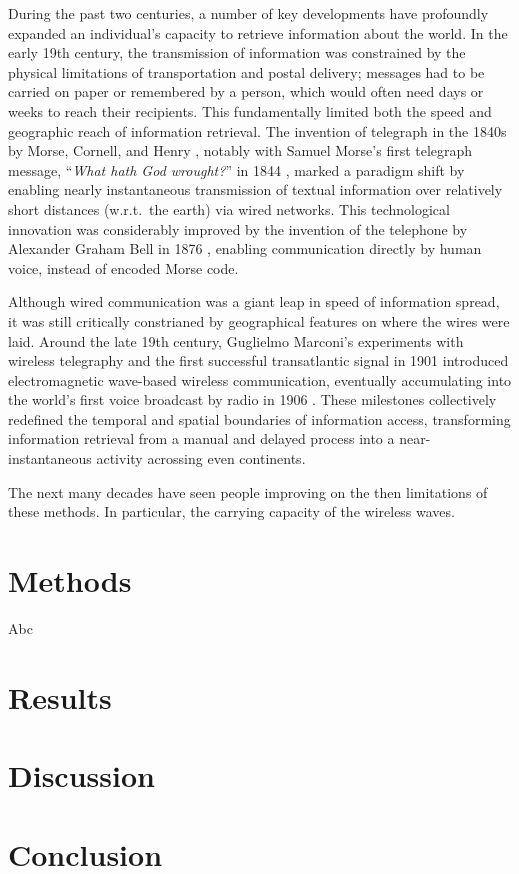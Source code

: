 \documentclass[project-plan]{report-template}
\begin{document}
During the past two centuries, a number of key developments have profoundly
expanded an individual's capacity to retrieve information about the world. In
the early 19th century, the transmission of information was constrained by the
physical limitations of transportation and postal delivery; messages had to be
carried on paper or remembered by a person, which would often need days or
weeks to reach their recipients. This fundamentally limited both the speed and
geographic reach of information retrieval. The invention of telegraph in the
1840s by Morse, Cornell, and Henry \cite{history.telegraph.1,
history.telegraph.2}, notably with Samuel Morse's first telegraph message,
``\emph{What hath God wrought?}'' in 1844 \cite{first.telegraph.msg}, marked a
paradigm shift by enabling nearly instantaneous transmission of textual
information over relatively short distances (w.r.t.\ the earth) via wired
networks.  This technological innovation was considerably improved by the
invention of the telephone by Alexander Graham Bell in 1876
\cite{history.telephone.1, history.telephone.2}, enabling communication
directly by human voice, instead of encoded Morse code. 

Although wired communication was a giant leap in speed
of information spread, it was still critically constrianed by geographical
features on where the wires were laid. Around the late 19th century, Guglielmo
Marconi's experiments with wireless telegraphy \cite{history.wireless.1} and
the first successful transatlantic signal in 1901
\cite{history.first.atlantic.broadcast} introduced electromagnetic wave-based
wireless communication, eventually accumulating into the world's first voice
broadcast by radio in 1906 \cite{first.voice.broadcast}. These milestones
collectively redefined the temporal and spatial boundaries of information
access, transforming information retrieval from a manual and delayed process
into a near-instantaneous activity acrossing even continents.

The next many decades have seen people improving on the then limitations of
these methods. In particular, the carrying capacity of the wireless waves.

\section{Methods}
Abc

\section{Results}

\section{Discussion}

\section{Conclusion}

\clearpage


\end{document}
